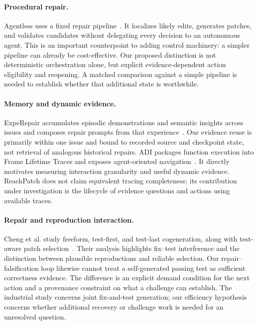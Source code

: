\documentclass[acmsmall,screen,review,anonymous]{acmart}
\newcommand{\system}{ReachPatch}
\begin{document}
\paragraph{Procedural repair.}
Agentless uses a fixed repair pipeline~\cite{xia2025agentless}. It localizes likely edits, generates patches, and validates candidates without delegating every decision to an autonomous agent. This is an important counterpoint to adding control machinery: a simpler pipeline can already be cost-effective. Our proposed distinction is not deterministic orchestration alone, but explicit evidence-dependent action eligibility and reopening. A matched comparison against a simple pipeline is needed to establish whether that additional state is worthwhile.

\paragraph{Memory and dynamic evidence.}
ExpeRepair accumulates episodic demonstrations and semantic insights across issues and composes repair prompts from that experience~\cite{mu2026experepair}. Our evidence reuse is primarily within one issue and bound to recorded source and checkpoint state, not retrieval of analogous historical repairs. ADI packages function execution into Frame Lifetime Traces and exposes agent-oriented navigation~\cite{xiang2026adi}. It directly motivates measuring interaction granularity and useful dynamic evidence. \system{} does not claim equivalent tracing completeness; its contribution under investigation is the lifecycle of evidence questions and actions using available traces.

\paragraph{Repair and reproduction interaction.}
Cheng et al. study freeform, test-first, and test-last cogeneration, along with test-aware patch selection~\cite{cheng2026cogeneration}. Their analysis highlights fix--test interference and the distinction between plausible reproductions and reliable selection. Our repair--falsification loop likewise cannot treat a self-generated passing test as sufficient correctness evidence. The difference is an explicit demand condition for the next action and a provenance constraint on what a challenge can establish. The industrial study concerns joint fix-and-test generation; our efficiency hypothesis concerns whether additional recovery or challenge work is needed for an unresolved question.
\end{document}
